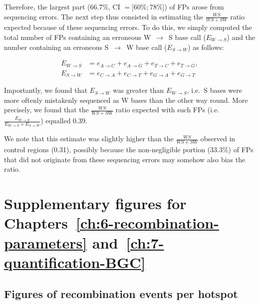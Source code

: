 Therefore, the largest part (66.7\%, CI $= [60\%; 78\%$]) of FPs arose from sequencing errors.
The next step thus consisted in estimating the $\frac{WS}{WS+SW}$ ratio expected because of these sequencing errors.
To do this, we simply computed the total number of FPs containing an erroneous W~$\rightarrow$~S base call ($E_{W\rightarrow S}$) and the number containing an erroneous S~$\rightarrow$~W base call ($E_{S\rightarrow W}$) as follows:

\begin{align}
        E_{W\rightarrow S}&= e_{A\rightarrow C} + e_{A\rightarrow G} + e_{T\rightarrow C} + e_{T\rightarrow G}, \\
        E_{S\rightarrow W}&= e_{C\rightarrow A} + e_{C\rightarrow T} + e_{G\rightarrow A} + e_{G\rightarrow T}
\end{align}

Importantly, we found that $E_{S\rightarrow W}$ was greater than $E_{W\rightarrow S}$, i.e.\ S bases were more oftenly mistakenly sequenced as W bases than the other way round.
More precisely, we found that the $\frac{WS}{WS+SW}$ ratio expected with such FPs (i.e.\ $\frac{E_{W\rightarrow S}}{E_{W\rightarrow S} + E_{S\rightarrow W}}$) equalled 0.39.

We note that this estimate was slightly higher than the $\frac{WS}{WS+SW}$ observed in control regions (0.31), possibly because the non-negligible portion (33.3\%) of FPs that did not originate from these sequencing errors may somehow also bias the ratio.









%
%



\hypersetup{linkcolor=titlepagecolorsection}
\section{Supplementary figures for Chapters~\ref{ch:6-recombination-parameters} and~\ref{ch:7-quantification-BGC}}
\hypersetup{linkcolor=black}


\subsection{Figures of recombination events per hotspot}

